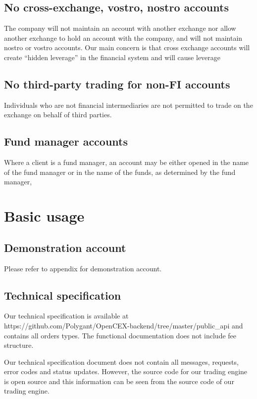\subsection{No cross-exchange, vostro, nostro accounts}
The company will not maintain an account with another exchange nor
allow another exchange to hold an account with the company, and will
not maintain nostro or vostro accounts.  Our main concern is that
cross exchange accounts will create ``hidden leverage'' in the
financial system and will cause leverage

\subsection{No third-party trading for non-FI accounts}
Individuals who are not financial intermediaries are not permitted to
trade on the exchange on behalf of third parties.

\subsection{Fund manager accounts}
Where a client is a fund manager, an account may be either opened in the name of
the fund manager or in the name of the funds, as determined by the
fund manager,

\section{Basic usage}
\subsection{Demonstration account}
Please refer to appendix for demonstration account.

\subsection{Technical specification}
Our technical specification is available at
https://github.com/Polygant/OpenCEX-backend/tree/master/public\_api
and contains all orders types.  The functional documentation does not
include fee structure.

Our technical specification document does not contain all messages,
requests, error codes and status updates.  However, the source code
for our trading engine is open source and this information can be seen
from the source code of our trading engine.

